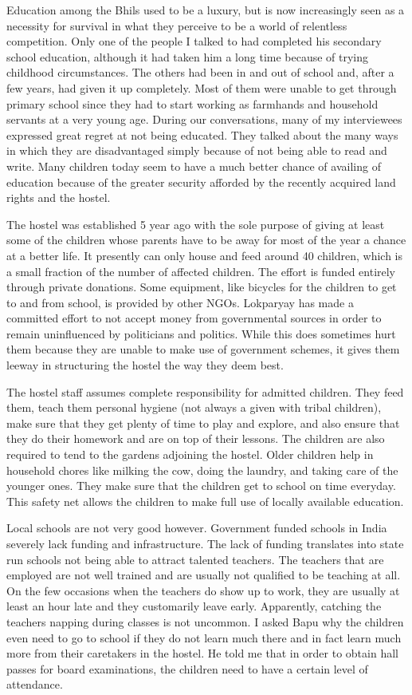 \documentclass[report.tex]{subfiles}
\begin{document}
Education among the Bhils used to be a luxury, but is now increasingly seen as a necessity for survival in what they perceive to be a world of relentless competition. Only one of the people I talked to had completed his secondary school education, although it had taken him a long time because of trying childhood circumstances. The others had been in and out of school and, after a few years, had given it up completely. Most of them were unable to get through primary school since they had to start working as farmhands and household servants at a very young age. During our conversations, many of my interviewees expressed great regret at not being educated. They talked about the many ways in which they are disadvantaged simply because of not being able to read and write. Many children today seem to have a much better chance of availing of education because of the greater security afforded by the recently acquired land rights and the hostel.

The hostel was established 5 year ago with the sole purpose of giving at least some of the children whose parents have to be away for most of the year a chance at a better life. It presently can only house and feed around 40 children, which is a small fraction of the number of affected children. The effort is funded entirely through private donations. Some equipment, like bicycles for the children to get to and from school, is provided by other NGOs. Lokparyay has made a committed effort to not accept money from governmental sources in order to remain uninfluenced by politicians and politics. While this does sometimes hurt them because they are unable to make use of government schemes, it gives them leeway in structuring the hostel the way they deem best.

The hostel staff assumes complete responsibility for admitted children. They feed them, teach them personal hygiene (not always a given with tribal children), make sure that they get plenty of time to play and explore, and also ensure that they do their homework and are on top of their lessons. The children are also required to tend to the gardens adjoining the hostel. Older children help in household chores like milking the cow, doing the laundry, and taking care of the younger ones. They make sure that the children get to school on time everyday. This safety net allows the children to make full use of locally available education.

Local schools are not very good however. Government funded schools in India severely lack funding and infrastructure. The lack of funding translates into state run schools not being able to attract talented teachers. The teachers that are employed are not well trained and are usually not qualified to be teaching at all. On the few occasions when the teachers do show up to work, they are usually at least an hour late and they customarily leave early. Apparently, catching the teachers napping during classes is not uncommon. I asked Bapu why the children even need to go to school if they do not learn much there and in fact learn much more from their caretakers in the hostel. He told me that in order to obtain hall passes for board examinations, the children need to have a certain level of attendance.
\end{document}
